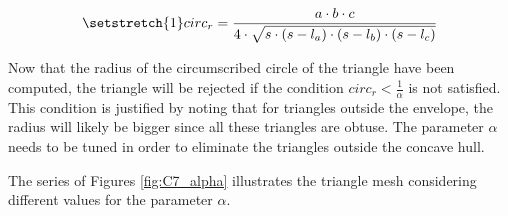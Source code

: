 \begin{equation}
    \setstretch{1}
   circ_r = \frac{a\cdot b\cdot c}{4\cdot \sqrt{s\cdot (s - l_a)\cdot (s - l_b)\cdot (s - l_c)}}\label{eq:C7_circum}
\end{equation}

Now that the radius of the circumscribed circle of the triangle have been computed, the triangle will be rejected if the condition $circ_r <\frac{1}{\alpha}$ is not satisfied. This condition is justified by noting that for triangles outside the envelope, the radius will likely be bigger since all these triangles are obtuse. The parameter $\alpha$ needs to be tuned in order to eliminate the triangles outside the concave hull. 

The series of Figures \ref{fig:C7_alpha} illustrates the triangle mesh considering different values for the parameter $\alpha$.

